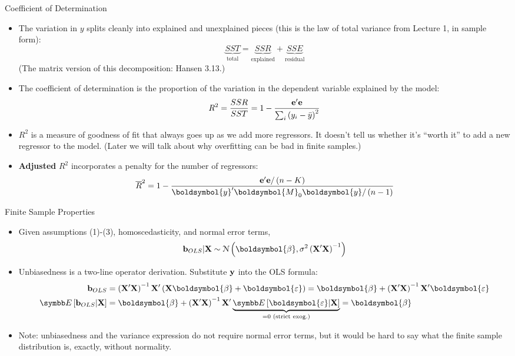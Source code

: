\documentclass[aspectratio=169,11pt]{beamer}
\begin{document}
\begin{frame}{Coefficient of Determination}
\begin{itemize}
	\item The variation in $y$ splits cleanly into explained and unexplained pieces
	(this is the \alert{law of total variance} from Lecture 1, in sample form):\[
	\underbrace{SST}_{\text{total}} = \underbrace{SSR}_{\text{explained}} + \underbrace{SSE}_{\text{residual}}
	\]
	(The matrix version of this decomposition: Hansen 3.13.)

	\smallskip
	\item The coefficient of determination is the proportion of the variation in the dependent variable
	explained by the model:\[
	R^{2} = \frac{SSR}{SST}
	= 1 -  \frac{{\bf e}'{\bf e}}{\sum_i \left(y_i - \bar{y}\right)^2}
\]

	\smallskip
	\item $R^{2}$ is a measure of goodness of fit that always goes up as we add more regressors. It doesn't 
	tell us whether it's ``worth it'' to add a new regressor to the model. (Later we will talk about why overfitting
	can be bad in finite samples.)

\smallskip
	\item {\bf Adjusted} $R^{2}$ incorporates a penalty for the number of regressors:
	\[
	\overline{R}^{2} 	= 1 -  \frac{{\bf e}'{\bf e}/\left(n-K\right)}{\boldsymbol{y}'\boldsymbol{M}_{0}\boldsymbol{y}/\left(n-1\right)}
	\]
\end{itemize}
\end{frame}




\begin{frame}{Finite Sample Properties}
\begin{itemize}
	\item Given assumptions (1)-(3), homoscedasticity, and normal error terms, \[
	{\bf b}_{OLS} | {\bf X} \sim \mathcal{N}\left(\boldsymbol{\beta},\sigma^{2} \left({\bf X}'{\bf X}  \right)^{-1} \right)
	\]

	\item Unbiasedness is a two-line operator derivation. Substitute ${\bf y}$ into the OLS formula:
	\begin{align*}
		{\bf b}_{OLS} &= \left({\bf X}'{\bf X}\right)^{-1}{\bf X}'\left({\bf X}\boldsymbol{\beta} + \boldsymbol{\varepsilon}\right)
		= \boldsymbol{\beta} + \left({\bf X}'{\bf X}\right)^{-1}{\bf X}'\boldsymbol{\varepsilon}\\
		\E\left[{\bf b}_{OLS}|{\bf X}\right] &= \boldsymbol{\beta} + \left({\bf X}'{\bf X}\right)^{-1}{\bf X}'\underbrace{\E\left[\boldsymbol{\varepsilon}|{\bf X}\right]}_{=0 \text{ (strict exog.)}} = \boldsymbol{\beta}
	\end{align*}

	\item Note: unbiasedness and the variance expression
	do not require normal error terms, but it would be hard to say what the finite sample
	distribution is, exactly, without normality.

\end{itemize}
\end{frame}
\end{document}
